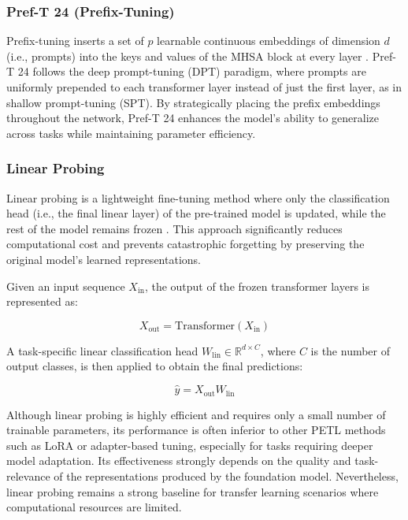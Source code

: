 \documentclass[11pt]{article}
\begin{document}
\subsubsection{Pref-T 24 (Prefix-Tuning)}
Prefix-tuning inserts a set of $p$ learnable continuous embeddings of dimension $d$ (i.e., prompts) into the keys and values of the MHSA block at every layer \cite{li2021prefix}. Pref-T 24 follows the deep prompt-tuning (DPT) paradigm, where prompts are uniformly prepended to each transformer layer instead of just the first layer, as in shallow prompt-tuning (SPT). By strategically placing the prefix embeddings throughout the network, Pref-T 24 enhances the model’s ability to generalize across tasks while maintaining parameter efficiency.

\subsubsection{Linear Probing}
Linear probing is a lightweight fine-tuning method where only the classification head (i.e., the final linear layer) of the pre-trained model is updated, while the rest of the model remains frozen \cite{kumar2022finetuning}. This approach significantly reduces computational cost and prevents catastrophic forgetting by preserving the original model’s learned representations.

Given an input sequence $X_{\text{in}}$, the output of the frozen transformer layers is represented as:

\begin{equation}
X_{\text{out}} = \text{Transformer}(X_{\text{in}})
\end{equation}

A task-specific linear classification head $W_{\text{lin}} \in \mathbb{R}^{d \times C}$, where $C$ is the number of output classes, is then applied to obtain the final predictions:

\begin{equation}
\hat{y} = X_{\text{out}} W_{\text{lin}}
\end{equation}

Although linear probing is highly efficient and requires only a small number of trainable parameters, its performance is often inferior to other PETL methods such as LoRA or adapter-based tuning, especially for tasks requiring deeper model adaptation. Its effectiveness strongly depends on the quality and task-relevance of the representations produced by the foundation model. Nevertheless, linear probing remains a strong baseline for transfer learning scenarios where computational resources are limited.
\end{document}
